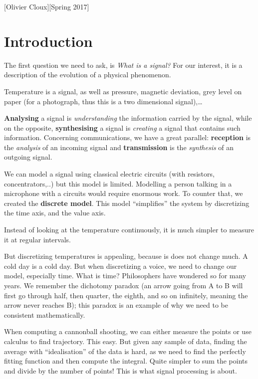 \documentclass[11pt,a4paper]{article}
\numberwithin{equation}{section}
\begin{document}
[Olivier Cloux][Spring 2017]
\tableofcontents

\section{Introduction}
The first question we need to ask, is \textit{What is a signal?} For our interest, it is a description of the evolution of a physical phenomenon.
\begin{example}
    Temperature is a signal, as well as pressure, magnetic deviation, grey level on paper (for a photograph, thus this is a two dimensional signal),\ldots%
\end{example}

\textbf{Analysing} a signal is \textit{understanding} the information carried by the signal, while on the opposite, \textbf{synthesising} a signal is \textit{creating} a signal that contains such information.
Concerning communications, we have a great parallel: \textbf{reception} is the \textit{analysis} of an incoming signal and \textbf{transmission} is the \textit{synthesis} of an outgoing signal.

We can model a signal using classical electric circuits (with resistors, concentrators,..) but this model is limited. Modelling a person talking in a microphone with a circuits would require enormous work. To counter that, we created the \textbf{discrete model}. This model ``simplifies'' the system by discretizing the time axis, and the value axis. 

\begin{example}
    Instead of looking at the temperature continuously, it is much simpler to measure it at regular intervals.
\end{example}
But discretizing temperatures is appealing, because is does not change much. A cold day is a cold day. But when discretizing a voice, we need to change our model, especially time. What is time? Philosophers have wondered so for many years. We remember the dichotomy paradox (an arrow going from A to B will first go through half, then quarter, the eighth, and so on infinitely, meaning the arrow never reaches B); this paradox is an example of why we need to be consistent mathematically. 

When computing a cannonball shooting, we can either measure the points or use calculus to find trajectory. This easy. But given any sample of data, finding the average with ``idealisation'' of the data is hard, as we need to find the perfectly fitting function and then compute the integral. Quite simpler to sum the points and divide by the number of points! This is what signal processing is about.
\end{document}
